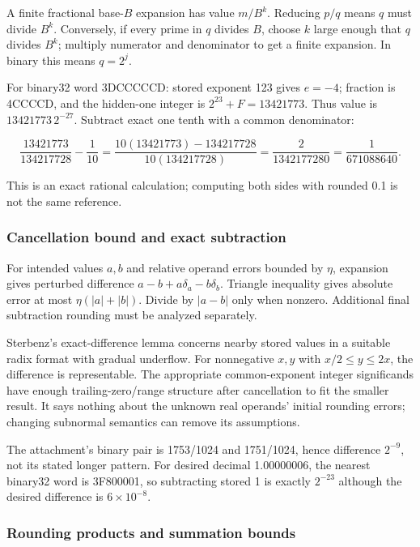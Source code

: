 A finite fractional base-\(B\) expansion has value \(m/B^k\). Reducing \(p/q\) means \(q\) must divide \(B^k\). Conversely, if every prime in \(q\) divides \(B\), choose \(k\) large enough that \(q\) divides \(B^k\); multiply numerator and denominator to get a finite expansion. In binary this means \(q=2^j\).

For binary32 word 3DCCCCCD: stored exponent 123 gives \(e=-4\); fraction is 4CCCCD, and the hidden-one integer is \(2^{23}+F=13421773\). Thus value is \(13421773\,2^{-27}\). Subtract exact one tenth with a common denominator:

\[
\frac{13421773}{134217728}-\frac1{10}
=\frac{10(13421773)-134217728}{10(134217728)}
=\frac{2}{1342177280}=\frac1{671088640}.
\]

This is an exact rational calculation; computing both sides with rounded 0.1 is not the same reference.

\subsubsection{Cancellation bound and exact subtraction}\label{cancellation-bound-and-exact-subtraction}

For intended values \(a,b\) and relative operand errors bounded by \(\eta\), expansion gives perturbed difference \(a-b+a\delta_a-b\delta_b\). Triangle inequality gives absolute error at most \(\eta(|a|+|b|)\). Divide by \(|a-b|\) only when nonzero. Additional final subtraction rounding must be analyzed separately.

Sterbenz's exact-difference lemma concerns nearby stored values in a suitable radix format with gradual underflow. For nonnegative \(x,y\) with \(x/2\le y\le2x\), the difference is representable. The appropriate common-exponent integer significands have enough trailing-zero/range structure after cancellation to fit the smaller result. It says nothing about the unknown real operands' initial rounding errors; changing subnormal semantics can remove its assumptions.

The attachment's binary pair is 1753/1024 and 1751/1024, hence difference \(2^{-9}\), not its stated longer pattern. For desired decimal 1.00000006, the nearest binary32 word is 3F800001, so subtracting stored 1 is exactly \(2^{-23}\) although the desired difference is \(6\times10^{-8}\).

\subsubsection{Rounding products and summation bounds}\label{rounding-products-and-summation-bounds}

